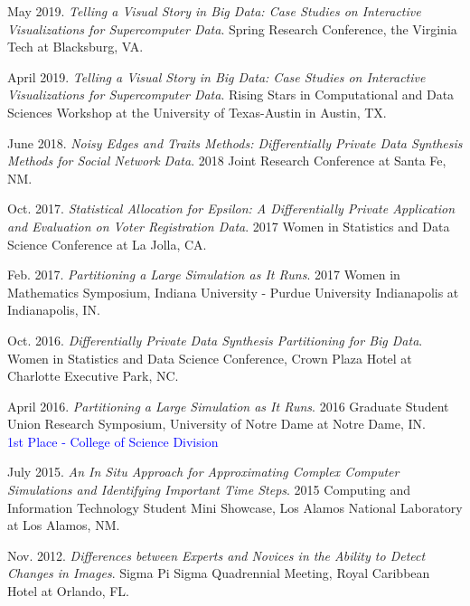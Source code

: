 \documentclass[11pt, letterpaper, roman]{moderncv} %
\begin{document}
\begin{etaremune}[topsep=0pt, itemsep=3pt, partopsep=0pt, parsep=0pt]
    \item May 2019. \textit{Telling a Visual Story in Big Data: Case Studies on Interactive Visualizations for Supercomputer Data}. Spring Research Conference, the Virginia Tech at Blacksburg, VA.
    
    \item April 2019. \textit{Telling a Visual Story in Big Data: Case Studies on Interactive Visualizations for Supercomputer Data}. Rising Stars in Computational and Data Sciences Workshop at the University of Texas-Austin in Austin, TX.
    
    \item June 2018. \textit{Noisy Edges and Traits Methods: Differentially Private Data Synthesis Methods for Social Network Data}. 2018 Joint Research Conference at Santa Fe, NM.
    
    \item Oct. 2017. \textit{Statistical Allocation for Epsilon: A Differentially Private Application and Evaluation on Voter Registration Data}. 2017 Women in Statistics and Data Science Conference at La Jolla, CA.
    
    \item Feb. 2017. \textit{Partitioning a Large Simulation as It Runs}. 2017 Women in Mathematics Symposium, Indiana University - Purdue University Indianapolis at Indianapolis, IN.
    
    \item Oct. 2016. \textit{Differentially Private Data Synthesis Partitioning for Big Data}. Women in Statistics and Data Science Conference, Crown Plaza Hotel at Charlotte Executive Park, NC. 
    
    \item April 2016. \textit{Partitioning a Large Simulation as It Runs}. 2016 Graduate Student Union Research Symposium, University of Notre Dame at Notre Dame, IN.\\
    \textcolor{blue}{1st Place - College of Science Division}
    
    \item July 2015. \textit{An In Situ Approach for Approximating Complex Computer Simulations and Identifying Important Time Steps}. 2015 Computing and Information Technology Student Mini Showcase, Los Alamos National Laboratory at Los Alamos, NM.
    
    \item Nov. 2012. \textit{Differences between Experts and Novices in the Ability to Detect Changes in Images}. Sigma Pi Sigma Quadrennial Meeting, Royal Caribbean Hotel at Orlando, FL.
    

\end{etaremune}
\end{document}
